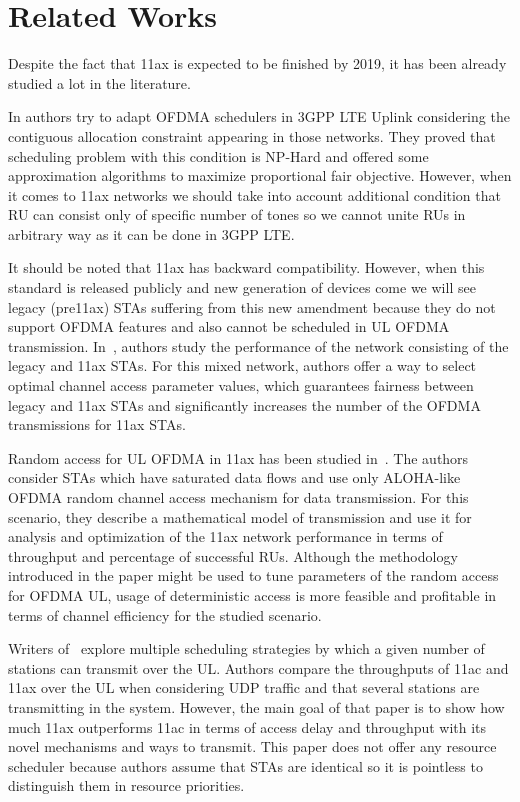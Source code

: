 \section{Related Works}
\label{sec:related}
Despite the fact that 11ax is expected to be finished by 2019, it has been already studied a lot in the literature.

In \cite{lee-proportionalfair} authors try to adapt OFDMA schedulers in 3GPP LTE Uplink considering the contiguous allocation constraint appearing in those networks. They proved that scheduling problem with this condition is NP-Hard and offered some approximation algorithms to maximize proportional fair objective. However, when it comes to 11ax networks we should take into account additional condition that RU can consist only of specific number of tones so we cannot unite RUs in arbitrary way as it can be done in 3GPP LTE. 

It should be noted that 11ax has backward compatibility. 
However, when this standard is released publicly and new generation of devices come we will see legacy (pre11ax) STAs suffering from this new amendment because they do not support OFDMA features and also cannot be scheduled in UL OFDMA transmission. 
In~\cite{khorov2016several}, authors study the performance of the network consisting of the legacy and 11ax STAs. 
For this mixed network, authors offer a way to select optimal channel access parameter values, which guarantees fairness between legacy and 11ax STAs and significantly increases the number of the OFDMA transmissions for 11ax STAs.

Random access for UL OFDMA in 11ax has been studied in~\cite{lanante2017performance}. 
The authors consider STAs which have saturated data flows and use only ALOHA-like OFDMA random channel access mechanism for data transmission. 
For this scenario, they describe a mathematical model of transmission and use it for analysis and optimization of the 11ax network performance in terms of throughput and percentage of successful RUs. 
Although the methodology introduced in the paper might be used to tune  parameters of the random access for OFDMA UL, usage of deterministic access is more feasible and profitable in terms of channel efficiency for the studied scenario.

Writers of~\cite{sharon2017scheduling} explore multiple scheduling strategies by which a given number of stations can transmit over the UL.
Authors compare the throughputs of 11ac and 11ax over the UL when considering UDP traffic and that several stations are transmitting in the system. 
However, the main goal of that paper is to show how much 11ax outperforms 11ac in terms of access delay and throughput with its novel mechanisms and ways to transmit. 
This paper does not offer any resource scheduler because authors assume that STAs are identical so it is pointless to distinguish them in resource priorities.  


